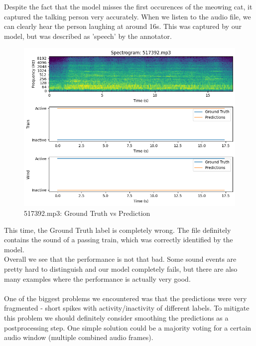 \documentclass{article}
\begin{document}
Despite the fact that the model misses the first occurences of the meowing cat, it captured the talking person very accurately. When we listen to the audio file, we can clearly hear the person laughing at around 16s. This was captured by our model, but was described as 'speech' by the annotator. 

\begin{figure}[H]
  \centering
  \includegraphics[width=0.6\linewidth]{517392_pred.png}
  \caption{517392.mp3: Ground Truth vs Prediction}
  \label{fig5}
\end{figure}

This time, the Ground Truth label is completely wrong. The file definitely contains the sound of a passing train, which was correctly identified by the model. \\

Overall we see that the performance is not that bad. Some sound events are pretty hard to distinguish and our model completely fails, but there are also many examples where the performance is actually very good.
\\\\
One of the biggest problems we encountered was that the predictions were very fragmented - short spikes with activity/inactivity of different labels. To mitigate this problem we should definitely consider smoothing the predictions as a postprocessing step. One simple solution could be a majority voting for a certain audio window (multiple combined audio frames).
\end{document}
